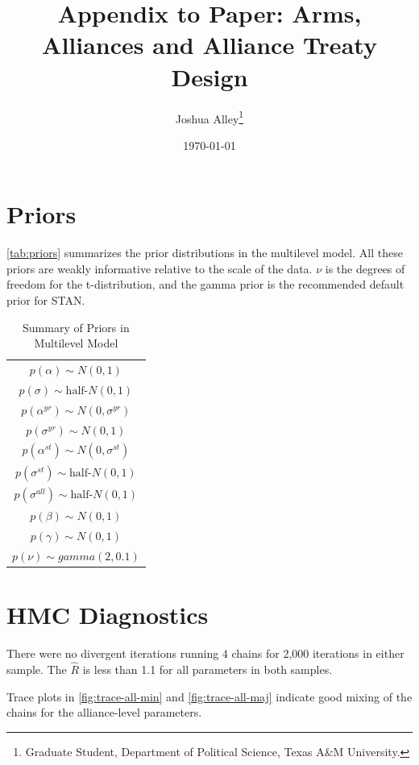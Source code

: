 \documentclass[12pt]{article}
\title{\textbf{Appendix to Paper: Arms, Alliances and Alliance Treaty Design}}
\author{Joshua Alley\footnote{Graduate Student,
Department of Political Science, Texas A\&M University.}}
\date{{\normalsize \today}}
\begin{document}
\maketitle 

\doublespace 



\section{Priors}

\autoref{tab:priors} summarizes the prior distributions in the multilevel model. 
All these priors are weakly informative relative to the scale of the data. 
$\nu$ is the degrees of freedom for the t-distribution, and the gamma prior is the recommended default prior for STAN. 

\begin{table} %
\begin{center}
\begin{tabular}{c} 
$ p(\alpha) \sim N(0, 1)$  \\
$ p(\sigma) \sim \mbox{half-}N(0, 1) $ \\
$ p(\alpha^{yr}) \sim N(0, \sigma^{yr}) $ \\ 
$ p(\sigma^{yr}) \sim N(0, 1) $ \\
$ p(\alpha^{st}) \sim N(0, \sigma^{st}) $ \\ 
$ p(\sigma^{st}) \sim \mbox{half-}N(0, 1) $ \\ 
$ p(\sigma^{all}) \sim \mbox{half-}N(0, 1) $ \\
$ p(\beta) \sim N(0, 1) $ \\
$ p(\gamma) \sim N(0, 1) $ \\ 
$ p(\nu) \sim gamma(2, 0.1)$ 
\end{tabular} 
\caption{Summary of Priors in Multilevel Model} 
\label{tab:priors}
\end{center} 
\end{table} 


\section{HMC Diagnostics}

There were no divergent iterations running 4 chains for 2,000 iterations in either sample. The $\hat{R}$ is less than 1.1 for all parameters in both samples. 

Trace plots in \autoref{fig:trace-all-min} and \autoref{fig:trace-all-maj} indicate good mixing of the chains for the alliance-level parameters. 
\end{document}
